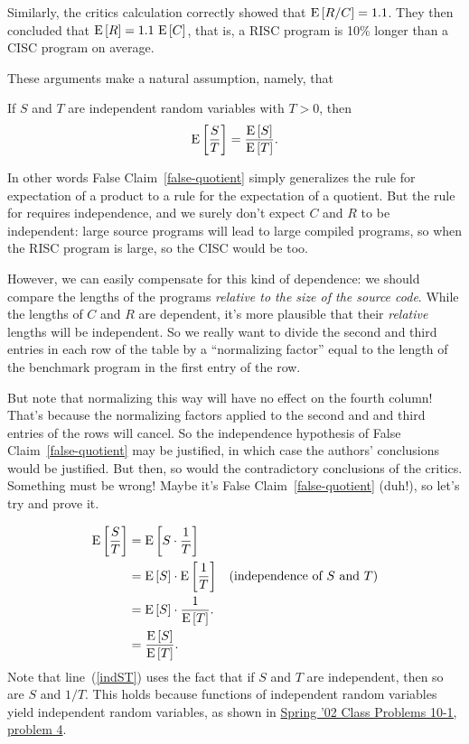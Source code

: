 \documentclass[11pt,twoside]{article}
\begin{document}
Similarly, the critics calculation correctly showed that $\mathop{\textup{E}}\nolimits\left[R/C\right] =
1.1$.  They then concluded that $\mathop{\textup{E}}\nolimits\left[R\right] = 1.1 \, \mathop{\textup{E}}\nolimits\left[C\right]$, that is,
a RISC program is 10\% longer than a CISC program on average.

These arguments make a natural assumption, namely, that
\begin{falseclm}\label{false-quotient}
If $S$ and $T$ are independent random variables with $T>0$, then
\[
\mathop{\textup{E}}\nolimits\left[\frac{S}{T}\right] = \frac{\mathop{\textup{E}}\nolimits\left[S\right]}{\mathop{\textup{E}}\nolimits\left[T\right]}.
\]
\end{falseclm}

In other words False Claim~\ref{false-quotient} simply generalizes the
rule for expectation of a product to a rule for the expectation of a
quotient.  But the rule for requires independence, and we surely don't
expect $C$ and $R$ to be independent: large source programs will lead to
large compiled programs, so when the RISC program is large, so the CISC
would be too.

However, we can easily compensate for this kind of dependence: we should
compare the lengths of the programs \emph{relative to the size of the
source code}.  While the lengths of $C$ and $R$ are dependent, it's more
plausible that their \emph{relative} lengths will be independent.  So we
really want to divide the second and third entries in each row of the
table by a ``normalizing factor'' equal to the length of the benchmark
program in the first entry of the row.

But note that normalizing this way will have no effect on the fourth
column!  That's because the normalizing factors applied to the second and
and third entries of the rows will cancel.  So the independence hypothesis
of False Claim~\ref{false-quotient} may be justified, in which case the
authors' conclusions would be justified.  But then, so would the
contradictory conclusions of the critics.  Something must be wrong!  Maybe
it's False Claim~\ref{false-quotient} (duh!), so let's try and prove it.

\begin{falseproof}
\begin{align}
\mathop{\textup{E}}\nolimits\left[\frac{S}{T}\right] & = \mathop{\textup{E}}\nolimits\left[S \cdot \frac{1}{T}\right] \notag\\
       & = \mathop{\textup{E}}\nolimits\left[S\right] \cdot \mathop{\textup{E}}\nolimits\left[\frac{1}{T}\right] & \text{(independence of $S$
       and $T$)}\label{indST}\\
      & = \mathop{\textup{E}}\nolimits\left[S\right] \cdot \frac{1}{\mathop{\textup{E}}\nolimits\left[T\right]}. \label{bug}\\
      & = \frac{\mathop{\textup{E}}\nolimits\left[S\right]}{\mathop{\textup{E}}\nolimits\left[T\right]}.\notag
\end{align}
Note that line~(\ref{indST}) uses the fact that if $S$ and $T$ are
independent, then so are $S$ and $1/T$.  This holds because functions of
independent random variables yield independent random variables, as shown
in
\href{http://theory.lcs.mit.edu/classes/6.042/spring02/handouts/miscellaneous/cp10W.pdf}
{Spring '02 Class Problems 10-1, problem 4}.
\end{falseproof}
\end{document}
